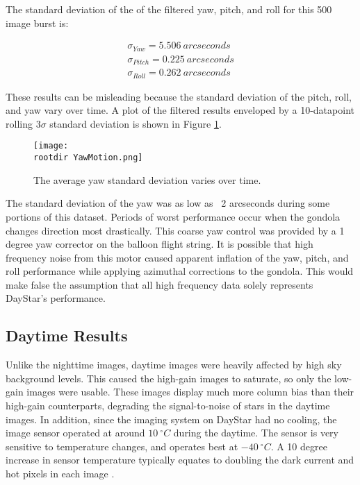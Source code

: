 \documentclass[twocolumn,letterpaper]{IEEEAerospace2012}
\newcommand{\rootdir}{./Figures/}
\begin{document}
The standard deviation of the of the filtered yaw, pitch, and roll for this 500 image burst is:

\begin{align*}
    \sigma_{Yaw} = 5.506 \ arcseconds \\
    \sigma_{Pitch} = 0.225 \ arcseconds \\
    \sigma_{Roll} = 0.262 \ arcseconds
\end{align*}

These results can be misleading because the standard deviation of the pitch, roll, and yaw vary over time. A plot of the filtered results enveloped by a 10-datapoint rolling $3\sigma$ standard deviation is shown in Figure \ref{fig:RollingSTD}.

\begin{figure}[H]
    \centering
    \texttt{[image: \\rootdir YawMotion.png]}
    \caption{The average yaw standard deviation varies over time.}
    \label{fig:RollingSTD}
\end{figure}

The standard deviation of the yaw was as low as ~2 arcseconds during some portions of this dataset. Periods of worst performance occur when the gondola changes direction most drastically. This coarse yaw control was provided by a 1 degree yaw corrector on the balloon flight string. It is possible that high frequency noise from this motor caused apparent inflation of the yaw, pitch, and roll performance while applying azimuthal corrections to the gondola. This would make false the assumption that all high frequency data solely represents DayStar's performance.

\subsection{Daytime Results}

Unlike the nighttime images, daytime images were heavily affected by high sky background levels. This caused the high-gain images to saturate, so only the low-gain images were usable. These images display much more column bias than their high-gain counterparts, degrading the signal-to-noise of stars in the daytime images. In addition, since the imaging system on DayStar had no cooling, the image sensor operated at around $10 \ ^{\circ} C$ during the daytime. The sensor is very sensitive to temperature changes, and operates best at $-40\ ^{\circ}C$. A 10 degree increase in sensor temperature typically equates to doubling the dark current and hot pixels in each image \cite{AndorTemp}.
\end{document}
